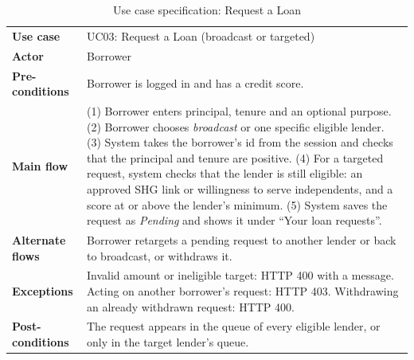 \documentclass[11pt,a4paper]{article}
\begin{document}
\begin{table}[H]
\centering
\caption{Use case specification: Request a Loan}
\label{tab:uc3}
\small
\begin{tabular}{@{}L{3.1cm}L{11.3cm}@{}}
\toprule
\textbf{Use case} & UC03: Request a Loan (broadcast or targeted)\\
\textbf{Actor} & Borrower\\
\textbf{Pre-conditions} & Borrower is logged in and has a credit score.\\
\textbf{Main flow} & (1) Borrower enters principal, tenure and an optional purpose. (2) Borrower chooses \emph{broadcast} or one specific eligible lender. (3) System takes the borrower's id from the session and checks that the principal and tenure are positive. (4) For a targeted request, system checks that the lender is still eligible: an approved SHG link or willingness to serve independents, and a score at or above the lender's minimum. (5) System saves the request as \emph{Pending} and shows it under ``Your loan requests''.\\
\textbf{Alternate flows} & Borrower retargets a pending request to another lender or back to broadcast, or withdraws it.\\
\textbf{Exceptions} & Invalid amount or ineligible target: HTTP 400 with a message. Acting on another borrower's request: HTTP 403. Withdrawing an already withdrawn request: HTTP 400.\\
\textbf{Post-conditions} & The request appears in the queue of every eligible lender, or only in the target lender's queue.\\
\bottomrule
\end{tabular}
\end{table}
\end{document}
